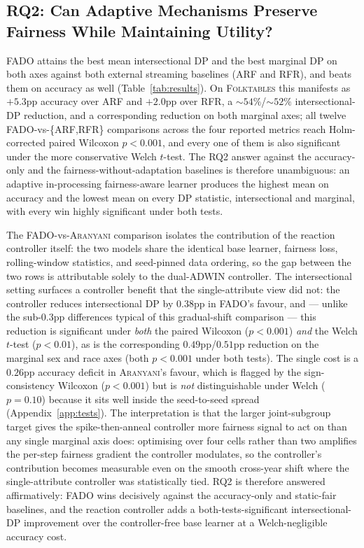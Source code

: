 \documentclass[sigconf,anonymous,review]{acmart}
\begin{document}
\subsection{RQ2: Can Adaptive Mechanisms Preserve Fairness While Maintaining Utility?}
\label{sec:results:rq2}
\textsc{FADO} attains the best mean intersectional DP and the best marginal DP on both axes against both external streaming baselines (\textsc{ARF} and
\textsc{RFR}), and beats them on accuracy as well (Table~\ref{tab:results}). On \textsc{Folktables} this manifests as $+5.3$pp accuracy over \textsc{ARF} and
$+2.0$pp over \textsc{RFR}, a $\sim 54\%$/$\sim 52\%$ intersectional-DP reduction, and a corresponding reduction on both marginal axes; all twelve
FADO-vs-\{\textsc{ARF},\textsc{RFR}\} comparisons across the four reported metrics reach Holm-corrected paired Wilcoxon $p<0.001$, and every one of them is also
significant under the more conservative Welch $t$-test. The RQ2 answer against the accuracy-only and the fairness-without-adaptation baselines is therefore
unambiguous: an adaptive in-processing fairness-aware learner produces the highest mean on accuracy and the lowest mean on every DP statistic, intersectional
and marginal, with every win highly significant under both tests.

The \textsc{FADO}-vs-\textsc{Aranyani} comparison isolates the contribution of the reaction controller itself: the two models share the identical base
learner, fairness loss, rolling-window statistics, and seed-pinned data ordering, so the gap between the two rows is attributable solely to the dual-ADWIN
controller. The intersectional setting surfaces a controller benefit that the single-attribute view did not: the controller reduces intersectional DP by
$0.38$pp in \textsc{FADO}'s favour, and --- unlike the sub-$0.3$pp differences typical of this gradual-shift comparison --- this reduction is significant under
\emph{both} the paired Wilcoxon ($p<0.001$) \emph{and} the Welch $t$-test ($p<0.01$), as is the corresponding $0.49$pp/$0.51$pp reduction on the marginal sex
and race axes (both $p<0.001$ under both tests). The single cost is a $0.26$pp accuracy deficit in \textsc{Aranyani}'s favour, which is flagged by the
sign-consistency Wilcoxon ($p<0.001$) but is \emph{not} distinguishable under Welch ($p=0.10$) because it sits well inside the seed-to-seed spread
(Appendix~\ref{app:tests}). The interpretation is that the larger joint-subgroup target gives the spike-then-anneal controller more fairness signal to
act on than any single marginal axis does: optimising over four cells rather than two amplifies the per-step fairness gradient the controller modulates, so the
controller's contribution becomes measurable even on the smooth cross-year shift where the single-attribute controller was statistically tied. RQ2 is therefore
answered affirmatively: \textsc{FADO} wins decisively against the accuracy-only and static-fair baselines, and the reaction controller adds a both-tests-significant
intersectional-DP improvement over the controller-free base learner at a Welch-negligible accuracy cost.
\end{document}

